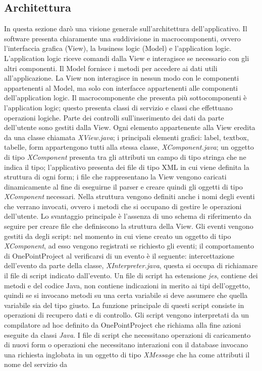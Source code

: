 \subsection{Architettura}
In questa sezione dar\`{o} una visione generale sull\textquoteright{}architettura dell\textquoteright{}applicativo. Il software presenta chiaramente una suddivisione in macrocomponenti, ovvero l\textquoteright{}interfaccia grafica (View), la business logic (Model) e l\textquoteright{}application logic. L\textquoteright{}application logic riceve comandi dalla View e interagisce se necessario con gli altri componenti. Il Model fornisce i metodi per accedere ai dati utili all\textquoteright{}applicazione. La View non interagisce in nessun modo con le componenti appartenenti al Model, ma solo con interfacce appartenenti alle componenti dell\textquoteright{}application logic. Il macrocomponente che presenta pi\`{u} sottocomponenti \`{e} l\textquoteright{}application logic; questo presenta classi di servizio e classi che effettuano operazioni logiche. Parte dei controlli sull\textquoteright{}inserimento dei dati da parte dell\textquoteright{}utente sono gestiti dalla View. Ogni elemento appartenente alla View eredita da una classe chiamata \textit{XView.java}; i principali elementi grafici: label, textbox, tabelle, form appartengono tutti alla stessa classe, \textit{XComponent.java}; un oggetto di tipo \textit{XComponent} presenta tra gli attributi un campo di tipo stringa che ne indica il tipo; l\textquoteright{}applicativo presenta dei file di tipo XML in cui viene definita la struttura di ogni form; i file che rappresentano la View vengono caricati dinamicamente al fine di eseguirne il parser e creare quindi gli oggetti di tipo \textit{XComponent} necessari. Nella struttura vengono definiti anche i nomi degli eventi che verrano invocati, ovvero i metodi che si occupano di gestire le operazioni dell\textquoteright{}utente. Lo svantaggio principale \`{e} l\textquoteright{}assenza di uno schema di riferimento da seguire per creare file che definiscono la struttura della View. Gli eventi vengono gestiti da degli script: nel momento in cui viene creato un oggetto di tipo \textit{XComponent}, ad esso vengono registrati se richiesto gli eventi; il comportamento di OnePointProject al verificarsi di un evento \`{e} il seguente: intercettazione dell\textquoteright{}evento da parte della classe, \textit{XInterpreter.java}, questa si occupa di richiamare il file di script indicato dall\textquoteright{}evento. Un file di script ha estensione \textit{jes}, contiene dei metodi e del codice Java, non contiene indicazioni in merito ai tipi dell\textquoteright{}oggetto, quindi se si invocano metodi su una certa variabile si deve assumere che quella variabile sia del tipo giusto. La funzione principale di questi script consiste in operazioni di recupero dati e di controllo. Gli script vengono interpretati da un compilatore ad hoc definito da OnePointProject che richiama alla fine azioni eseguite da classi \textit{Java}. I file di script che necessitano operazioni di caricamento di nuovi form o operazioni che necessitano interazioni con il database invocano una richiesta inglobata in un oggetto di tipo \textit{XMessage} che ha come attributi il nome del servizio da 